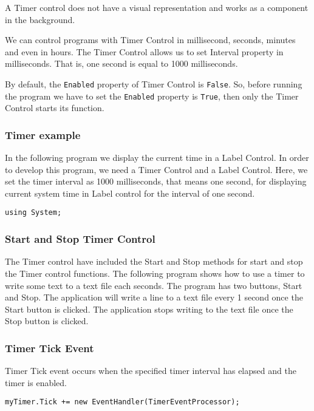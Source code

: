 A Timer control does not have a visual representation and works as a component in the background.

We can control programs with Timer Control in millisecond, seconds, minutes and even in hours. The Timer Control allows us to set Interval property in milliseconds. That is, one second is equal to 1000 milliseconds.

By default, the \texttt{Enabled} property of Timer Control is \texttt{False}. So, before running the program we have to set the \texttt{Enabled} property is \texttt{True}, then only the Timer Control starts its function.

\subsubsection*{Timer example}
In the following program we display the current time in a Label Control. In order to develop this program, we need a Timer Control and a Label Control. Here, we set the timer interval as 1000 milliseconds, that means one second, for displaying current system time in Label control for the interval of one second.

\begin{lstlisting}[numbers=none]
	using System;
\end{lstlisting}

\subsubsection*{Start and Stop Timer Control}
The Timer control have included the Start and Stop methods for start and stop the Timer control functions. The following {\cs} program shows how to use a timer to write some text to a text file each seconds. The program has two buttons, Start and Stop. The application will write a line to a text file every 1 second once the Start button is clicked. The application stops writing to the text file once the Stop button is clicked.

\subsubsection*{Timer Tick Event}
Timer Tick event occurs when the specified timer interval has elapsed and the timer is enabled.

\begin{lstlisting}[numbers=none]
	myTimer.Tick += new EventHandler(TimerEventProcessor);
\end{lstlisting}

